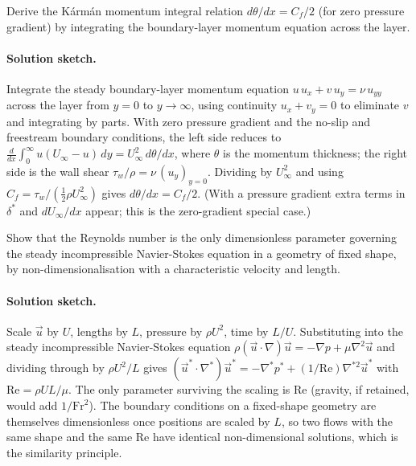 \begin{exercise}
Derive the Kármán momentum integral relation $d\theta/dx = C_f/2$
(for zero pressure gradient) by integrating the boundary-layer
momentum equation across the layer.

\paragraph{Solution sketch.} Integrate the steady boundary-layer
momentum equation $u\,u_x + v\,u_y = \nu\,u_{yy}$ across the layer
from $y=0$ to $y\to\infty$, using continuity $u_x + v_y = 0$ to
eliminate $v$ and integrating by parts. With zero pressure gradient
and the no-slip and freestream boundary conditions, the left side
reduces to $\tfrac{d}{dx}\int_0^\infty u(U_\infty - u)\,dy =
U_\infty^2\,d\theta/dx$, where $\theta$ is the momentum thickness;
the right side is the wall shear $\tau_w/\rho = \nu\,(u_y)_{y=0}$.
Dividing by $U_\infty^2$ and using $C_f = \tau_w/(\tfrac12\rho
U_\infty^2)$ gives $d\theta/dx = C_f/2$. (With a pressure gradient
extra terms in $\delta^*$ and $dU_\infty/dx$ appear; this is the
zero-gradient special case.)
\end{exercise}

\begin{exercise}
Show that the Reynolds number is the only dimensionless parameter
governing the steady incompressible Navier-Stokes equation in a
geometry of fixed shape, by non-dimensionalisation with a
characteristic velocity and length.

\paragraph{Solution sketch.} Scale $\vec u$ by $U$, lengths by $L$,
pressure by $\rho U^2$, time by $L/U$. Substituting into the steady
incompressible Navier-Stokes equation $\rho(\vec u\cdot\nabla)\vec u
= -\nabla p + \mu\nabla^2\vec u$ and dividing through by $\rho U^2/L$
gives $(\vec u^*\cdot\nabla^*)\vec u^* = -\nabla^* p^* + (1/\text{Re})
\nabla^{*2}\vec u^*$ with $\text{Re} = \rho U L/\mu$. The only
parameter surviving the scaling is $\text{Re}$ (gravity, if retained,
would add $1/\text{Fr}^2$). The boundary conditions on a fixed-shape
geometry are themselves dimensionless once positions are scaled by
$L$, so two flows with the same shape and the same $\text{Re}$ have
identical non-dimensional solutions, which is the similarity
principle.
\end{exercise}

